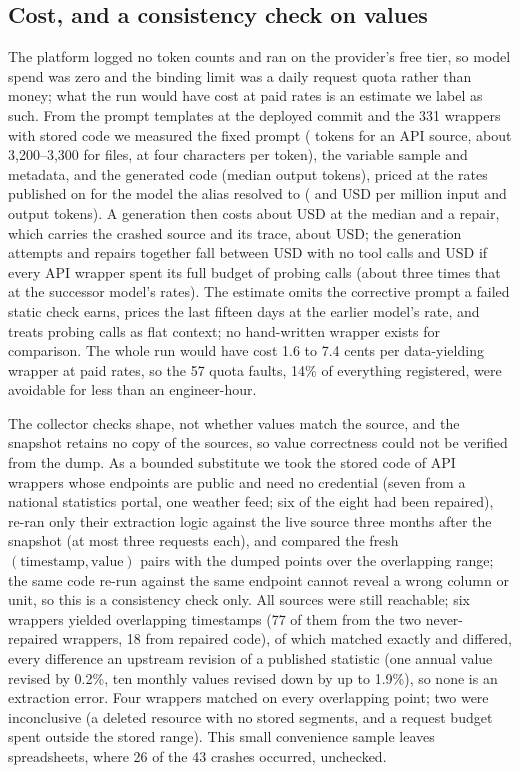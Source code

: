 \documentclass[conference]{IEEEtran}
\begin{document}
\subsection{Cost, and a consistency check on values}
\label{sec:res-cost}
The platform logged no token counts and ran on the provider's free tier, so model
spend was zero and the binding limit was a daily request quota rather than money;
what the run would have cost at paid rates is an estimate we label as such. From the prompt templates at the deployed commit and the 331 wrappers with stored
code we measured the fixed prompt (\costFixedApiTok{} tokens for an API source, about
3{,}200--3{,}300 for files, at four characters per token), the variable sample and
metadata, and the generated code (median \costCodeTok{} output tokens), priced at the
rates published on \costPriceDate{} for the model the alias resolved to
(\costInPrice{} and \costOutPrice{} USD per million input and output tokens). A generation then costs about \costGenMedianUSD{} USD at the median and a
repair, which carries the crashed source and its trace, about \costRepairMedianUSD{}
USD; the \nWrappers{} generation attempts and \nHealEvents{} repairs together fall
between \costTotalLowUSD{} USD with no tool calls and \costTotalHighUSD{} USD if every
API wrapper spent its full budget of probing calls (about three times that at the
successor model's rates). The estimate omits the corrective prompt a failed static check earns, prices the last
fifteen days at the earlier model's rate, and treats probing calls as flat context; no
hand-written wrapper exists for comparison. The whole run would have cost 1.6 to 7.4
cents per data-yielding wrapper at paid rates, so the 57 quota faults, 14\% of
everything registered, were avoidable for less than an engineer-hour.

The collector checks shape, not whether values match the source, and the snapshot
retains no copy of the sources, so value correctness could not be verified from the
dump. As a bounded substitute we took the stored code of
\spotN{} API wrappers whose endpoints are public and need no credential (seven from
a national statistics portal, one weather feed; six of the eight had been
repaired), re-ran only their extraction logic against the live source three months
after the snapshot (at most three requests each), and compared the fresh
$(\textrm{timestamp},\textrm{value})$ pairs with the dumped points over the
overlapping range; the same code re-run against the same endpoint cannot reveal a
wrong column or unit, so this is a consistency check only. All \spotReachable{} sources were still reachable; six wrappers
yielded \spotOverlap{} overlapping timestamps (77 of them from the two never-repaired
wrappers, 18 from repaired code), of which \spotMatch{} matched exactly and
\spotMismatch{} differed, every difference an upstream revision of a published
statistic (one annual value revised by 0.2\%, ten monthly values revised down by up to
1.9\%), so none is an extraction error. Four wrappers matched on every
overlapping point; two were inconclusive (a deleted resource with no stored
segments, and a request budget spent outside the stored range). This small
convenience sample leaves spreadsheets, where 26 of the 43 crashes occurred,
unchecked.
\end{document}
